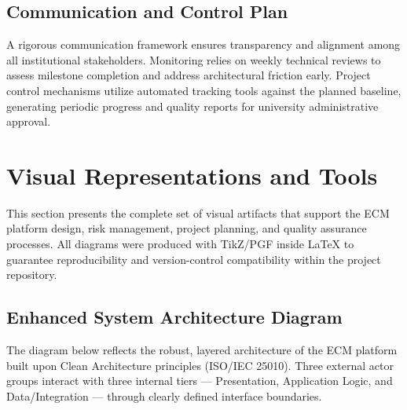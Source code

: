 \documentclass[conference]{IEEEtran}
\begin{document}
\subsection{Communication and Control Plan}
A rigorous communication framework ensures transparency and alignment among all institutional stakeholders. Monitoring relies on weekly technical reviews to assess milestone completion and address architectural friction early. Project control mechanisms utilize automated tracking tools against the planned baseline, generating periodic progress and quality reports for university administrative approval.

\section{Visual Representations and Tools}
This section presents the complete set of visual artifacts that support the ECM platform design, risk management, project planning, and quality assurance processes. All diagrams were produced with TikZ/PGF inside \LaTeX{} to guarantee reproducibility and version-control compatibility within the project repository.

\subsection{Enhanced System Architecture Diagram}
The diagram below reflects the robust, layered architecture of the ECM platform built upon Clean Architecture principles (ISO/IEC 25010). Three external actor groups interact with three internal tiers — Presentation, Application Logic, and Data/Integration — through clearly defined interface boundaries.
\end{document}
